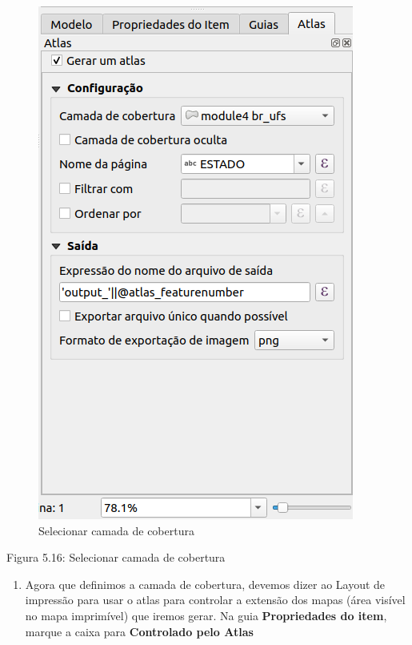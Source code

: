 \documentclass[
  portuguese,
]{krantz}
\providecommand{\tightlist}{%
  \setlength{\itemsep}{0pt}\setlength{\parskip}{0pt}}
\begin{document}
\begin{figure}
\centering
\includegraphics{media/modulo5/coverage-layer.png}
\caption{Selecionar camada de cobertura}
\end{figure}

Figura 5.16: Selecionar camada de cobertura

\begin{enumerate}
\def\labelenumi{\arabic{enumi}.}
\setcounter{enumi}{3}
\tightlist
\item
  Agora que definimos a camada de cobertura, devemos dizer ao Layout de impressão para usar o atlas para controlar a extensão dos mapas (área visível no mapa imprimível) que iremos gerar. Na guia \textbf{Propriedades do item}, marque a caixa para \textbf{Controlado pelo Atlas}
\end{enumerate}
\end{document}
